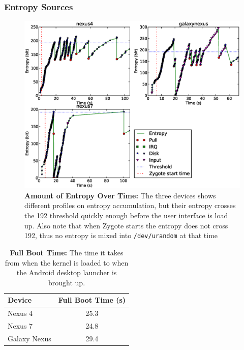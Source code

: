 \subsubsection{Entropy Sources}
\begin{figure}[t]
\begin{center}
\includegraphics[scale=0.6]{entropy.eps}
\end{center}
\caption{{\bf Amount of Entropy Over Time:} The three devices shows different profiles on entropy accumulation, but their entropy crosses the 192 threshold quickly enough before the user interface is load up. Also note that when Zygote starts the entropy does not cross 192, thus no entropy is mixed into \texttt{/dev/urandom} at that time }
\label{figentropy}
\end{figure}

\begin{table}
\begin{center}
\begin{tabular}{|l|c|}
\hline
\bf Device & \bf Full Boot Time (s) \\
\hline
Nexus 4 & 25.3 \\
\hline
Nexus 7 & 24.8 \\
\hline
Galaxy Nexus & 29.4 \\
\hline

\end{tabular}
\end{center}
\caption{{\bf Full Boot Time:} The time it takes from when the kernel is loaded to when the Android desktop launcher is brought up.}
\label{tblboottime}
\end{table}

